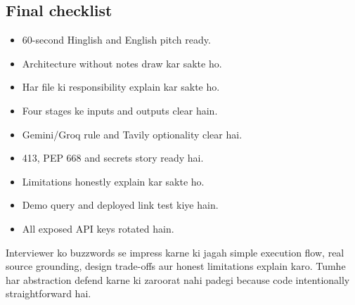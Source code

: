 \documentclass[11pt,a4paper]{article}
\begin{document}
\subsection{Final checklist}

\begin{itemize}[label=$\square$]
  \item 60-second Hinglish and English pitch ready.
  \item Architecture without notes draw kar sakte ho.
  \item Har file ki responsibility explain kar sakte ho.
  \item Four stages ke inputs and outputs clear hain.
  \item Gemini/Groq rule and Tavily optionality clear hai.
  \item 413, PEP 668 and secrets story ready hai.
  \item Limitations honestly explain kar sakte ho.
  \item Demo query and deployed link test kiye hain.
  \item All exposed API keys rotated hain.
\end{itemize}

\begin{keybox}
Interviewer ko buzzwords se impress karne ki jagah simple execution flow, real source grounding, design trade-offs aur honest limitations explain karo. Tumhe har abstraction defend karne ki zaroorat nahi padegi because code intentionally straightforward hai.
\end{keybox}
\end{document}
